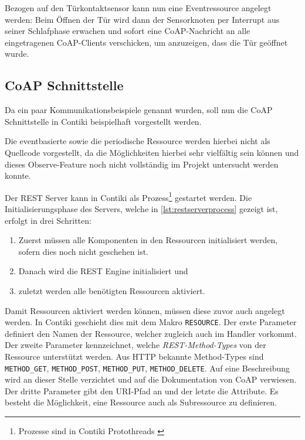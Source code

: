 	Bezogen auf den Türkontaktsensor kann nun eine Eventressource angelegt
	werden: Beim Öffnen der Tür wird dann der Sensorknoten per Interrupt
	aus seiner Schlafphase erwachen und sofort eine CoAP-Nachricht
	an alle eingetragenen CoAP-Clients verschicken, um anzuzeigen,
	dass die Tür geöffnet wurde.


\subsection{CoAP Schnittstelle}
	Da ein paar Kommunikationsbeispiele genannt wurden, soll
	nun die CoAP Schnittstelle in Contiki beispielhaft vorgestellt werden.

	Die eventbasierte sowie die periodische Ressource werden hierbei nicht
	als Quellcode vorgestellt, da die Möglichkeiten hierbei sehr vielfältig
	sein können und dieses Observe-Feature noch nicht vollständig im
	Projekt untersucht werden konnte.

	Der REST Server kann in Contiki als
	Prozess\footnote{Prozesse sind in Contiki Protothreads
		\autocite{dunkels05using, dunkels06protothreads, dunkels07simplifying}}
	gestartet werden.
	Die Initialisierungsphase des Servers,
	welche in \autoref{lst:restserverprocess} gezeigt ist,
	erfolgt in drei Schritten:
	\begin{enumerate}
	\item 	Zuerst müssen alle Komponenten in den Ressourcen initialisiert werden,
		sofern dies noch nicht geschehen ist.
	\item 	Danach wird die REST Engine initialisiert und
	\item 	zuletzt werden alle benötigten Ressourcen
		aktiviert.
	\end{enumerate}

	

	Damit Ressourcen aktiviert werden können, müssen diese zuvor
	auch angelegt werden. In Contiki geschieht dies mit dem Makro
	\lstinline=RESOURCE=. Der erste Parameter definiert den Namen
	der Ressource, welcher zugleich auch im Handler vorkommt.
	Der zweite Parameter kennzeichnet, welche \emph{REST-Method-Types}
	von der Ressource unterstützt werden. Aus HTTP bekannte Method-Types
	sind
	\lstinline=METHOD_GET=,
	\lstinline=METHOD_POST=,
	\lstinline=METHOD_PUT=,
	\lstinline=METHOD_DELETE=.
	Auf eine Beschreibung wird an dieser Stelle verzichtet und auf die
	Dokumentation von CoAP \autocite{kovatsch11low-power} verwiesen.
	Der dritte Parameter gibt den URI-Pfad an und der letzte
	die Attribute. Es besteht die Möglichkeit, eine Ressource
	auch als Subressource zu definieren.

